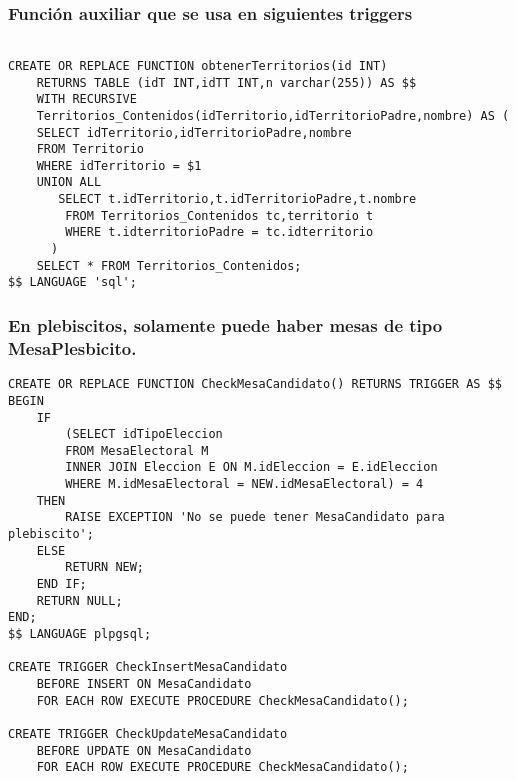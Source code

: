 \subsubsection{Función auxiliar que se usa en siguientes triggers}
\begin{verbatim}

CREATE OR REPLACE FUNCTION obtenerTerritorios(id INT) 
    RETURNS TABLE (idT INT,idTT INT,n varchar(255)) AS $$
    WITH RECURSIVE 
    Territorios_Contenidos(idTerritorio,idTerritorioPadre,nombre) AS (
    SELECT idTerritorio,idTerritorioPadre,nombre 
    FROM Territorio 
    WHERE idTerritorio = $1
    UNION ALL
       SELECT t.idTerritorio,t.idTerritorioPadre,t.nombre
        FROM Territorios_Contenidos tc,territorio t
        WHERE t.idterritorioPadre = tc.idterritorio
      )
    SELECT * FROM Territorios_Contenidos;
$$ LANGUAGE 'sql';
\end{verbatim}

\subsubsection{En plebiscitos, solamente puede haber mesas de tipo MesaPlesbicito.}

\begin{verbatim}
CREATE OR REPLACE FUNCTION CheckMesaCandidato() RETURNS TRIGGER AS $$
BEGIN
    IF 
        (SELECT idTipoEleccion 
        FROM MesaElectoral M 
        INNER JOIN Eleccion E ON M.idEleccion = E.idEleccion
        WHERE M.idMesaElectoral = NEW.idMesaElectoral) = 4  
    THEN
        RAISE EXCEPTION 'No se puede tener MesaCandidato para plebiscito';
    ELSE
        RETURN NEW;
    END IF;
    RETURN NULL;
END;
$$ LANGUAGE plpgsql;

CREATE TRIGGER CheckInsertMesaCandidato
    BEFORE INSERT ON MesaCandidato
    FOR EACH ROW EXECUTE PROCEDURE CheckMesaCandidato();

CREATE TRIGGER CheckUpdateMesaCandidato
    BEFORE UPDATE ON MesaCandidato
    FOR EACH ROW EXECUTE PROCEDURE CheckMesaCandidato();
\end{verbatim}

